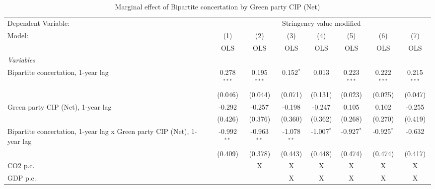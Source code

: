 
\begin{table}[htbp]
   \caption{Marginal effect of Bipartite concertation by Green party CIP (Net)}
   \centering
   \begin{tabular}{lccccccc}
      \toprule
      Dependent Variable: & \multicolumn{7}{c}{Stringency value modified}\\
      Model:                                                                 & (1)           & (2)           & (3)           & (4)          & (5)           & (6)           & (7)\\  
                                                                             &  OLS          & OLS           & OLS           & OLS          & OLS           & OLS           & OLS\\  
      \midrule
      \emph{Variables}\\
      Bipartite concertation, 1-year lag                                     & 0.278$^{***}$ & 0.195$^{***}$ & 0.152$^{*}$   & 0.013        & 0.223$^{***}$ & 0.222$^{***}$ & 0.215$^{***}$\\   
                                                                             & (0.046)       & (0.044)       & (0.071)       & (0.131)      & (0.023)       & (0.025)       & (0.047)\\   
      Green party CIP (Net), 1-year lag                                      & -0.292        & -0.257        & -0.198        & -0.247       & 0.105         & 0.102         & -0.255\\   
                                                                             & (0.426)       & (0.376)       & (0.360)       & (0.362)      & (0.268)       & (0.270)       & (0.419)\\   
      Bipartite concertation, 1-year lag x Green party CIP (Net), 1-year lag & -0.992$^{**}$ & -0.963$^{**}$ & -1.078$^{**}$ & -1.007$^{*}$ & -0.927$^{*}$  & -0.925$^{*}$  & -0.632\\   
                                                                             & (0.409)       & (0.378)       & (0.443)       & (0.448)      & (0.474)       & (0.474)       & (0.417)\\   
      CO2 p.c.                                                               &               & X             & X             & X            & X             & X             & X\\  
      GDP p.c.                                                               &               &               & X             & X            & X             & X             & X\\  

\end{tabular}
\end{table}

